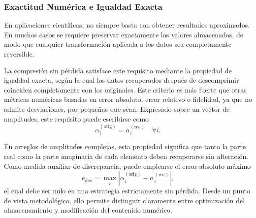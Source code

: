 \subsubsection{Exactitud Numérica e Igualdad Exacta}

En aplicaciones científicas, no siempre basta con obtener resultados aproximados. En muchos casos se requiere preservar exactamente los valores almacenados, de modo que cualquier transformación aplicada a los datos sea completamente reversible.

La compresión sin pérdida satisface este requisito mediante la propiedad de igualdad exacta, según la cual los datos recuperados después de descomprimir coinciden completamente con los originales. Este criterio es más fuerte que otras métricas numéricas basadas en error absoluto, error relativo o fidelidad, ya que no admite desviaciones, por pequeñas que sean. Expresado sobre un vector de amplitudes, este requisito puede escribirse como
\[
    \alpha_i^{(\text{orig})} = \alpha_i^{(\text{rec})} \quad \forall i.
\]

En arreglos de amplitudes complejas, esta propiedad significa que tanto la parte real como la parte imaginaria de cada elemento deben recuperarse sin alteración. Como medida auxiliar de discrepancia, puede emplearse el error absoluto máximo
\[
    e_{\text{abs}} = \max_i \left|\alpha_i^{(\text{orig})} - \alpha_i^{(\text{rec})}\right|,
\]
el cual debe ser nulo en una estrategia estrictamente sin pérdida. Desde un punto de vista metodológico, ello permite distinguir claramente entre optimización del almacenamiento y modificación del contenido numérico.

